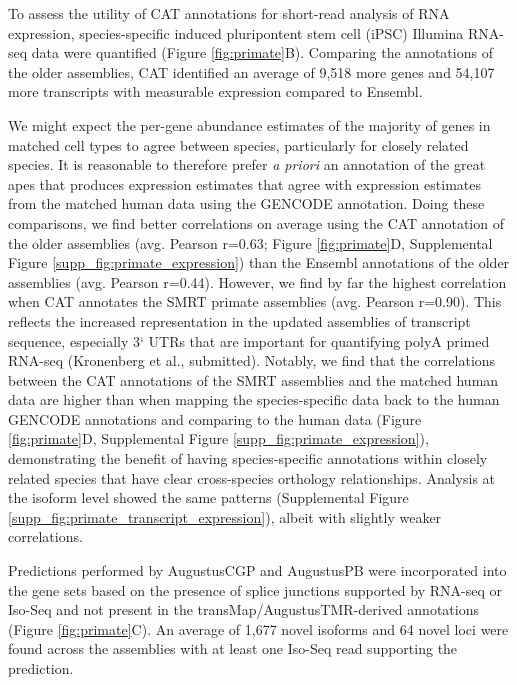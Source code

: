 \documentclass[fleqn,10pt]{wlscirep}
\begin{document}
To assess the utility of CAT annotations for short-read analysis of RNA expression, species-specific induced pluripontent stem cell (iPSC) Illumina RNA-seq data were quantified (Figure \ref{fig:primate}B). Comparing the annotations of the older assemblies, CAT identified an average of 9,518 more genes and 54,107 more transcripts with measurable expression compared to Ensembl.

We might expect the per-gene abundance estimates of the majority of genes in matched cell types to agree between species, particularly for closely related species. It is reasonable to therefore prefer \textit{a priori} an annotation of the great apes that produces expression estimates that agree with expression estimates from the matched human data using the GENCODE annotation. Doing these comparisons, we find better correlations on average using the CAT annotation of the older assemblies (avg. Pearson r=0.63; Figure \ref{fig:primate}D, Supplemental Figure \ref{supp_fig:primate_expression}) than the Ensembl annotations of the older assemblies (avg. Pearson r=0.44). However, we find by far the highest correlation when CAT annotates the SMRT primate assemblies (avg. Pearson r=0.90). This reflects the increased representation in the updated assemblies of transcript sequence, especially 3` UTRs that are important for quantifying polyA primed RNA-seq (Kronenberg et al., submitted). Notably, we find that the correlations between the CAT annotations of the SMRT assemblies and the matched human data are higher than when mapping the species-specific data back to the human GENCODE annotations and comparing to the human data (Figure \ref{fig:primate}D, Supplemental Figure \ref{supp_fig:primate_expression}), demonstrating the benefit of having species-specific annotations within closely related species that have clear cross-species orthology relationships. Analysis at the isoform level showed the same patterns (Supplemental Figure \ref{supp_fig:primate_transcript_expression}), albeit with slightly weaker correlations.

Predictions performed by AugustusCGP and AugustusPB were incorporated into the gene sets based on the presence of splice junctions supported by RNA-seq or Iso-Seq and not present in the transMap/AugustusTMR-derived annotations (Figure \ref{fig:primate}C). An average of 1,677 novel isoforms and 64 novel loci were found across the assemblies with at least one Iso-Seq read supporting the prediction.
\end{document}
